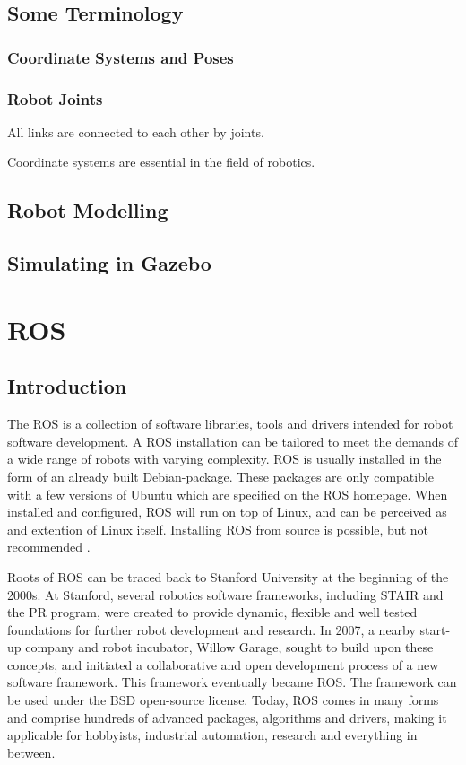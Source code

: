 \subsection{Some Terminology}

\subsubsection{Coordinate Systems and Poses}

\subsubsection{Robot Joints}

All links are connected to each other by joints. 

Coordinate systems are essential in the field of robotics. 

\subsection{Robot Modelling}

\subsection{Simulating in Gazebo}

\section{ROS}

\subsection{Introduction}

The \ac{ROS} is a collection of software libraries, tools and drivers intended for robot software development. A \ac{ROS} installation can be tailored to meet the demands of a wide range of robots with varying complexity. \ac{ROS} is usually installed in the form of an already built Debian-package. These packages are only compatible with a few versions of Ubuntu which are specified on the \ac{ROS} homepage. When installed and configured, \ac{ROS} will run on top of Linux, and can be perceived as and extention of Linux itself. Installing \ac{ROS} from source is possible, but not recommended \cite{ROS_install}.

Roots of \ac{ROS} can be traced back to Stanford University at the beginning of the 2000s. At Stanford, several robotics software frameworks, including \ac{STAIR} and the \ac{PR} program, were created to provide dynamic, flexible and well tested foundations for further robot development and research. In 2007, a nearby start-up company and robot incubator, Willow Garage, sought to build upon these concepts, and initiated a collaborative and open development process of a new software framework. This framework eventually became \ac{ROS}\cite{ROS_history}\cite{rosbook15}. The framework can be used under the BSD open-source license\cite{BCD_license}. Today, \ac{ROS} comes in many forms and comprise hundreds of advanced packages, algorithms and drivers, making it applicable for hobbyists, industrial automation, research and everything in between. 

